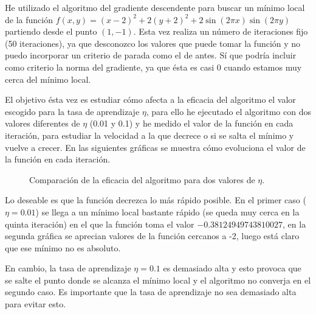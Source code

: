 \documentclass[a4]{article}
\begin{document}
He utilizado el algoritmo del gradiente descendente para buscar un mínimo local de la función
$f(x,y)=(x-2)^2+2(y+2)^2+2\sin(2\pi x)\sin(2\pi y)$ partiendo desde el punto $(1,-1)$. Esta vez
realiza un número de iteraciones fijo (50 iteraciones), ya que desconozco los valores que puede
tomar la función y no puedo incorporar un criterio de parada como el de antes. Sí que podría incluir
como criterio la norma del gradiente, ya que ésta es casi 0 cuando estamos muy cerca del mínimo local.

El objetivo ésta vez es estudiar cómo afecta a la eficacia del algoritmo el valor escogido para la
tasa de aprendizaje $\eta$, para ello he ejecutado el algoritmo con dos valores diferentes de $\eta$
(0.01 y 0.1) y he medido el valor de la función en cada iteración, para estudiar la velocidad a la que
decrece o si se salta el mínimo y vuelve a crecer. En las siguientes gráficas se muestra cómo evoluciona
el valor de la función en cada iteración.

\begin{figure}[H]
    \centering    
    \caption{Comparación de la eficacia del algoritmo para dos valores de $\eta$.}
    \label{fig:comp-eta}
\end{figure}

Lo deseable es que la función decrezca lo más rápido posible. En el primer caso ($\eta=0.01$) se llega a un mínimo local
bastante rápido (se queda muy cerca en la quinta iteración) en el que la función toma el valor $-0.38124949743810027$,
en la segunda gráfica se aprecian valores de la función cercanos a -2, luego está claro que ese mínimo no es absoluto.

En cambio, la tasa de aprendizaje $\eta=0.1$ es demasiado alta y esto provoca que se salte el punto donde se alcanza el
mínimo local y el algoritmo no converja en el segundo caso. Es importante que la tasa de aprendizaje no sea demasiado alta
para evitar esto.
\end{document}
